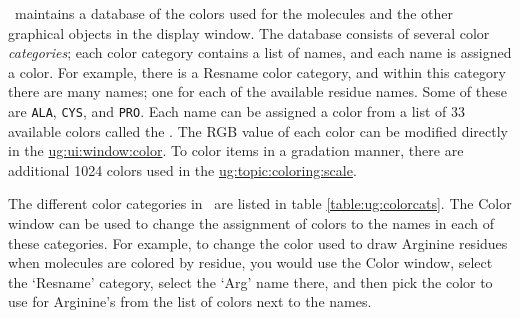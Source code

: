 \VMD\ maintains a database of the colors used for the molecules and the
other graphical objects in the display window.  The database consists
of several color {\em categories}; each color
category contains a list of names, and each name is assigned a color.
For example, there is a Resname color category, and within this
category there are many names; one for each of the available residue
names.  Some of these are {\tt ALA}, {\tt CYS}, and {\tt PRO}.  Each
name can be assigned a color from a list of 33 available colors called
the .  The RGB value of each color can
be modified directly in the
\hyperref{{\sf Color} window}{{\sf Color} window [\S}{]}{ug:ui:window:color}.
To color items in a gradation manner,
there are additional 1024 colors used in the
\hyperref{color scale}{color scale [\S}{]}{ug:topic:coloring:scale}.

The different color categories in \VMD\ are listed in table
\ref{table:ug:colorcats}.  The {\sf Color} window
can be used to change the assignment
of colors to the names in each of these categories.  For example, to
change the color used to draw Arginine residues when molecules are
colored by residue, you would use the {\sf Color} window, select the `Resname'
category, select the `Arg' name there, and then pick the color to use
for Arginine's from the list of colors next to the names.


